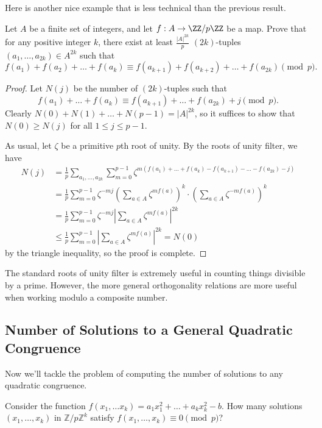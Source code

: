 \documentclass{scrartcl}
\begin{document}
Here is another nice example that is less technical than the previous result. 

\begin{example}
	Let $A$ be a finite set of integers, and let $f: A\rightarrow \ZZ/p\ZZ$ 
	be a map. Prove that for any positive integer $k$, there exist at least 
	$\frac{|A|^{2k}}{p}$ $(2k)$-tuples $(a_1, \dots, a_{2k})\in A^{2k}$ such that 
	$$f(a_1)+f(a_2)+\dots+f(a_k) \equiv f(a_{k+1})+f(a_{k+2})+\dots+f(a_{2k}) \pmod p.$$
\end{example}

\begin{proof}
	Let $N(j)$ be the number of $(2k)$-tuples such that 
	$$f(a_1)+\dots+f(a_k)\equiv f(a_{k+1})+\dots+f(a_{2k})+j\pmod p.$$
	Clearly $N(0)+N(1)+\dots+N(p-1)=|A|^{2k}$, so it suffices to show that 
	$N(0)\ge N(j)$ for all $1\le j \le p-1$. 
	
	As usual, let $\zeta$ be a primitive $p$th root of unity. 
	By the roots of unity filter, we have 
	\begin{align*}
		N(j) &= \frac{1}{p} \sum_{a_1, \dots, a_{2k}} \sum_{m=0}^{p-1} 
		\zeta^{m(f(a_1)+\dots+f(a_k)-f(a_{k+1})-\dots-f(a_{2k})-j)} \\
		&= \frac{1}{p} \sum_{m=0}^{p-1} \zeta^{-mj} \left(\sum_{a\in A}\zeta^{mf(a)}\right)^k\cdot 
		\left(\sum_{a\in A}\zeta^{-mf(a)}\right)^k \\
		&= \frac{1}{p}\sum_{m=0}^{p-1} \zeta^{-mj} \left | \sum_{a\in A} \zeta^{mf(a)}\right |^{2k} \\
		&\le \frac{1}{p}\sum_{m=0}^{p-1} \left | \sum_{a\in A} \zeta^{mf(a)}\right |^{2k} = N(0)
	\end{align*}
	by the triangle inequality, so the proof is complete.
\end{proof}

The standard roots of unity filter is extremely useful in counting things divisible by a prime. 
However, the more general orthogonality relations are more useful when working 
modulo a composite number. 

\subsection{Number of Solutions to a General Quadratic Congruence}

Now we'll tackle the problem of computing the number of solutions to any quadratic congruence. 

\begin{example}
	Consider the function $f(x_1, \dots x_k)=a_1x_1^2+\dots+a_kx_k^2-b$. 
	How many solutions $(x_1,\dots, x_k)$ in $\mathbb{Z}/p\mathbb{Z}^k$ 
	satisfy $f(x_1, \dots, x_k)\equiv 0\pmod p$?
\end{example}
\end{document}
